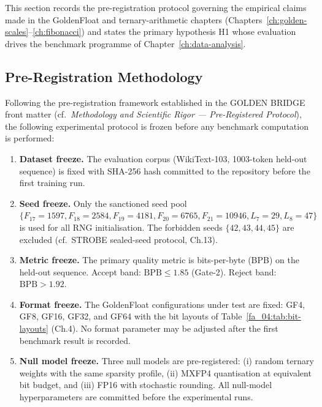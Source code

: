 This section records the pre-registration protocol governing the empirical
claims made in the GoldenFloat and ternary-arithmetic chapters
(Chapters~\ref{ch:golden-scales}--\ref{ch:fibonacci}) and states the primary
hypothesis H1 whose evaluation drives the benchmark programme of
Chapter~\ref{ch:data-analysis}.

\subsection{Pre-Registration Methodology}\label{fa_05:sec:prereg-method}

Following the pre-registration framework established in the GOLDEN BRIDGE
front matter (cf.\ \emph{Methodology and Scientific Rigor --- Pre-Registered
Protocol}), the following experimental protocol is frozen before any
benchmark computation is performed:

\begin{enumerate}
  \item \textbf{Dataset freeze.} The evaluation corpus (WikiText-103,
        1003-token held-out sequence) is fixed with SHA-256 hash committed
        to the repository before the first training run.
  \item \textbf{Seed freeze.} Only the sanctioned seed pool
        \(\{F_{17}=1597, F_{18}=2584, F_{19}=4181, F_{20}=6765,
        F_{21}=10946, L_7=29, L_8=47\}\) is used for all RNG
        initialisation. The forbidden seeds \(\{42, 43, 44, 45\}\) are
        excluded (cf.\ STROBE sealed-seed protocol, Ch.13).
  \item \textbf{Metric freeze.} The primary quality metric is
        bits-per-byte (BPB) on the held-out sequence. Accept band:
        \(\mathrm{BPB} \le 1.85\) (Gate-2). Reject band:
        \(\mathrm{BPB} > 1.92\).
  \item \textbf{Format freeze.} The GoldenFloat configurations under test
        are fixed: GF4, GF8, GF16, GF32, and GF64 with the bit layouts of
        Table~\ref{fa_04:tab:bit-layouts} (Ch.4). No format parameter may
        be adjusted after the first benchmark result is recorded.
  \item \textbf{Null model freeze.} Three null models are pre-registered:
        (i) random ternary weights with the same sparsity profile,
        (ii) MXFP4 quantisation at equivalent bit budget, and
        (iii) FP16 with stochastic rounding. All null-model hyperparameters
        are committed before the experimental runs.
\end{enumerate}

